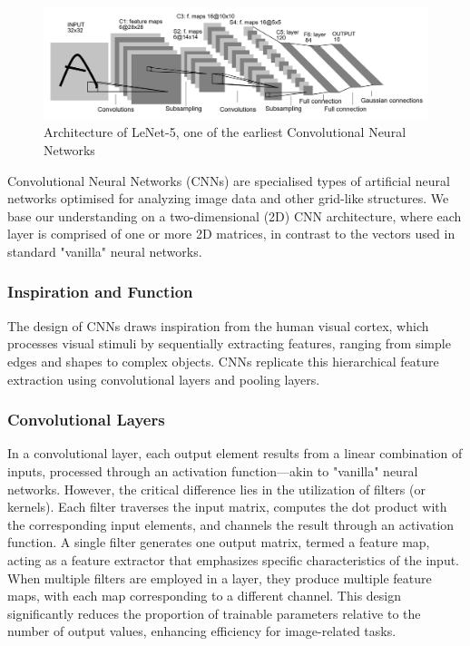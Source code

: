 \documentclass[12pt]{article}
\begin{document}
\begin{figure}[h]
    \includegraphics[width=1\linewidth]{Le-Net 5.png}
    
    \caption{Architecture of LeNet-5, one of the earliest Convolutional Neural Networks \cite{726791}} 
    \label{fig:enter-label}
\end{figure}

Convolutional Neural Networks (CNNs) are specialised types of artificial neural networks optimised for analyzing image data and other grid-like structures. We base our understanding on a two-dimensional (2D) CNN architecture, where each layer is comprised of one or more 2D matrices, in contrast to the vectors used in standard "vanilla" neural networks.

\subsubsection*{Inspiration and Function}

The design of CNNs draws inspiration from the human visual cortex, which processes visual stimuli by sequentially extracting features, ranging from simple edges and shapes to complex objects. CNNs replicate this hierarchical feature extraction using convolutional layers and pooling layers. 

\subsubsection*{Convolutional Layers}

In a convolutional layer, each output element results from a linear combination of inputs, processed through an activation function—akin to "vanilla" neural networks. However, the critical difference lies in the utilization of filters (or kernels). Each filter traverses the input matrix, computes the dot product with the corresponding input elements, and channels the result through an activation function. 
A single filter generates one output matrix, termed a feature map, acting as a feature extractor that emphasizes specific characteristics of the input. 
When multiple filters are employed in a layer, they produce multiple feature maps, with each map corresponding to a different channel. 
This design significantly reduces the proportion of trainable parameters relative to the number of output values, enhancing efficiency for image-related tasks.
\end{document}
